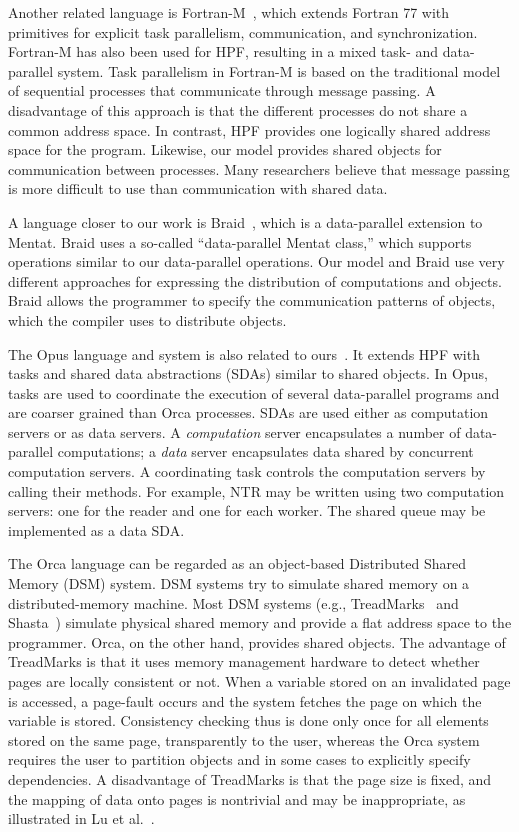 \documentclass{acmtrans2e}
\begin{document}
Another related language is Fortran-M~\cite{foster94}, which extends
Fortran 77 with primitives for explicit task parallelism,
communication, and synchronization.  Fortran-M has also been used for
HPF, resulting in a mixed task- and data-parallel system.
Task parallelism in Fortran-M is based on the
traditional model of sequential processes that communicate through
message passing.  A disadvantage of this approach is that the
different processes do not share a common address space. In contrast,
HPF provides one logically shared address space for the
program. Likewise, our model provides shared objects for communication
between processes.  Many researchers believe that message passing is
more difficult to use than communication with shared data.

A language closer to our work is Braid~\cite{west95}, which is a data-parallel
extension to Mentat. Braid uses a so-called ``data-parallel
Mentat class,'' which supports operations similar to our data-parallel
operations. Our model and Braid use very different approaches for
expressing the distribution of computations and objects.  Braid allows
the programmer to specify the communication patterns of objects, which
the compiler uses to distribute objects.

The Opus language and system is also related to
ours~\cite{haines95}. It extends HPF with tasks and shared data
abstractions (SDAs) similar to shared objects. In Opus, tasks are used
to coordinate the execution of several data-parallel programs and are
coarser grained than Orca processes. SDAs are used either as
computation servers or as data servers. A \emph{computation} server
encapsulates a number of data-parallel computations; a \emph{data}
server encapsulates data shared by concurrent computation servers. A
coordinating task controls the computation servers by calling their
methods. For example, NTR may be written using two computation
servers: one for the reader and one for each worker. The shared queue
may be implemented as a data SDA.

The Orca language can be regarded as an object-based Distributed
Shared Memory (DSM) system. DSM systems try to simulate shared
memory on a distributed-memory machine. Most DSM systems
(e.g., TreadMarks~\cite{amza94,lu95} and Shasta~\cite{Scales:1996})
simulate physical shared memory and provide a flat address space
to the programmer. Orca, on the other hand, provides shared objects.
The advantage of TreadMarks is that it uses memory management hardware to
detect whether pages are locally consistent or not. When a variable
stored on an invalidated page is accessed, a page-fault occurs and the
system fetches the page on which the variable is stored.
Consistency checking thus is done only once for
all elements stored on the same page, transparently to the user, whereas
the Orca system requires the user to partition objects and in some cases to
explicitly specify dependencies.  A disadvantage of TreadMarks is
that the page size is fixed, and the mapping of data onto pages is
nontrivial and may be inappropriate, as illustrated in Lu et al.~\citeyear{lu95}.
\end{document}

